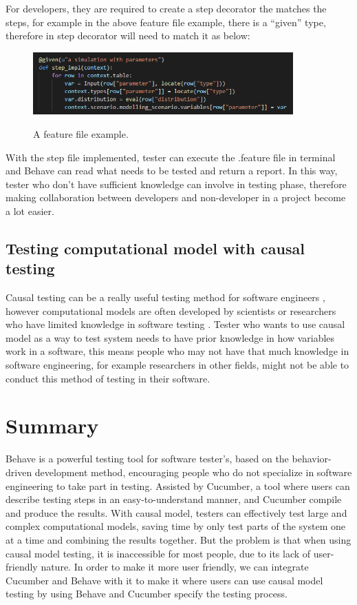 For developers, they are required to create a step decorator the matches the steps, for example in the above feature file example, there is a “given” type, therefore in step decorator will need to match it as below:
\begin{figure}[h]
	\centering
	\includegraphics[width=10cm]{figures/stepFile.png}\\
	\caption{A feature file example.}
	\label{fig:figure1}
\end{figure}

With the step file implemented, tester can execute the .feature file in terminal and Behave can read what needs to be tested and return a report. In this way, tester who don’t have sufficient knowledge can involve in testing phase, therefore making collaboration between developers and non-developer in a project become a lot easier.


\subsection{Testing computational model with causal testing}
Causal testing can be a really useful testing method for software engineers \cite{Reference13}, however computational models are often developed by scientists or researchers who have limited knowledge in software testing \cite{Reference8}. Tester who wants to use causal model as a way to test system needs to have prior knowledge in how variables work in a software, this means people who may not have that much knowledge in software engineering, for example researchers in other fields, might not be able to conduct this method of testing in their software.

\section{Summary}

Behave is a powerful testing tool for software tester’s, based on the behavior-driven development method, encouraging people who do not specialize in software engineering to take part in testing. Assisted by Cucumber, a tool where users can describe testing steps in an easy-to-understand manner, and Cucumber compile and produce the results. With causal model, testers can effectively test large and complex computational models, saving time by only test parts of the system one at a time and combining the results together. But the problem is that when using causal model testing, it is inaccessible for most people, due to its lack of user-friendly nature. In order to make it more user friendly, we can integrate Cucumber and Behave with it to make it where users can use causal model testing by using Behave and Cucumber specify the testing process.
